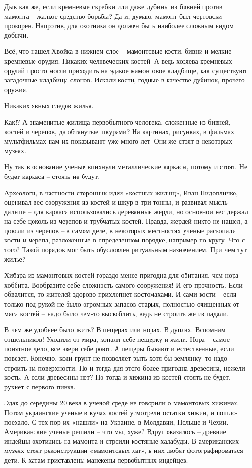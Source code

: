 Дык как же, если кремневые скребки или даже дубины из бивней против мамонта – жалкое средство борьбы? Да и, думаю, мамонт был чертовски проворен. Напротив, для охотника он должен быть наиболее сложным видом добычи.

Всё, что нашел Хвойка в нижнем слое – мамонтовые кости, бивни и мелкие кремневые орудия. Никаких человеческих костей. А ведь хозяева кремневых орудий просто могли приходить на эдакое мамонтовое кладбище, как существуют загадочные кладбища слонов. Искали кости, годные в качестве дубинок, прочего оружия.

Никаких явных следов жилья.

Как!? А знаменитые жилища первобытного человека, сложенные из бивней, костей и черепов, да обтянутые шкурами? На картинах, рисунках, в фильмах, мультфильмах нам их показывают уже много лет. Они же стоят в некоторых музеях.

Ну так в основание ученые впихнули металлические каркасы, потому и стоят. Не будет каркаса – стоять не будут. 

Археологи, в частности сторонник идеи «костных жилищ», Иван Пидопличко, оценивал вес сооружения из костей и шкур в три тонны, и развивал мысль дальше – для каркаса использовались деревянные жерди, но основной вес держал на себе цоколь из черепов и трубчатых костей. Правда, жердей никто не нашел, а цоколи из черепов – в самом деле, в некоторых местностях ученые раскопали кости и черепа, разложенные в определенном порядке, например по кругу. Что с того? Такой порядок мог быть обусловлен ритуальным назначением. При чем тут жилье?

Хибара из мамонтовых костей гораздо менее пригодна для обитания, чем нора хоббита. Вообразите себе сложность самого сооружения! И его прочность. Если обвалится, то жителей здорово прихлопнет костомахами. И сами кости – если только под рукой не было огромных запасов старых, полностью очищенных от мяса костей – надо было чем-то выскоблить, ведь не строить же из падали.

В чем же удобнее было жить? В пещерах или норах. В дуплах. Вспомним отшельников! Уходили от мира, копали себе пещерку и жили. Нора – самое понятное дело, все звери себе роют. А пещеры бывают и естественные, если повезет. Конечно, коли грунт не позволяет рыть хотя бы землянку, то надо строить на поверхности. Но и тогда для этого более пригодна древесина, нежели кость. А если древесины нет? Но тогда и хижина из костей стоять не будет, рухнет с первого пинка.

Эдак до середины 20 века в ученой среде не говорили о мамонтовых хижинах. Потом украинские ученые в кучах костей усмотрели остатки хижин, и пошло-поехало. С тех пор их «нашли» на Украине, в Молдавии, Польше и Чехии. Американские ученые решили – что мы, хуже? Вдруг оказалось – древние индейцы охотились на мамонта и строили костяные халабуды. В американских музеях стоят реконструкции «мамонтовых хат», в них любят фотографироваться дети. К хатам приставлены манекены первобытных индейцев.

